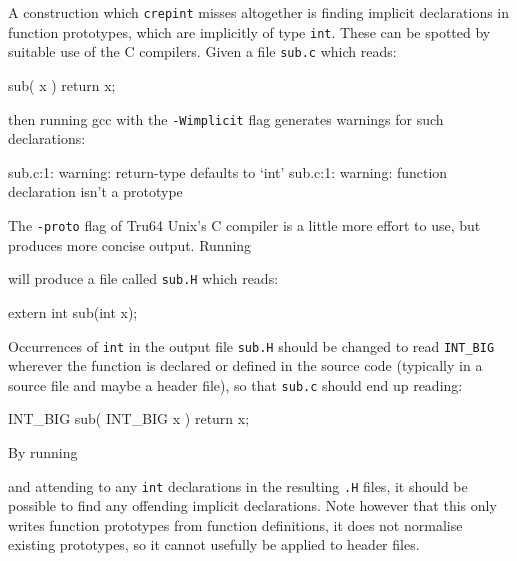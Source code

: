 \documentclass[twoside,11pt,nolof]{starlink}
\providecommand{\file}[1]{\texttt{#1}}
\providecommand{\routine}[1]{\texttt{#1}}
\providecommand{\cc}[1]{\texttt{#1}}
\newenvironment{squote}{\begin{small}}{\end{small}}
\begin{document}
A construction which \routine{crepint} misses altogether is finding
implicit declarations in function prototypes, which are implicitly
of type \cc{int}.
These can be spotted by suitable use of the C compilers.
Given a file \file{sub.c} which reads:
\begin{squote}
\begin{terminalv}
sub( x ) {
   return x;
}
\end{terminalv}
\end{squote}
then running gcc with the \texttt{-Wimplicit} flag generates warnings for
such declarations:
\begin{squote}
\begin{terminalv}
sub.c:1: warning: return-type defaults to `int'
sub.c:1: warning: function declaration isn't a prototype
\end{terminalv}
\end{squote}
The \texttt{-proto} flag of Tru64 Unix's C compiler is a little more
effort to use, but produces more concise output.  Running
\begin{squote}
\begin{terminalv}
\end{terminalv}
\end{squote}
will produce a file called \file{sub.H} which reads:
\begin{squote}
\begin{terminalv}
extern int sub(int x);
\end{terminalv}
\end{squote}
Occurrences of \cc{int} in the output file \file{sub.H} should be
changed to read \cc{INT\_BIG} wherever the function is declared or
defined in the source code (typically in a source file and maybe a
header file), so that \file{sub.c} should
end up reading:
\begin{squote}
\begin{terminalv}
INT_BIG sub( INT_BIG x ) {
   return x;
}
\end{terminalv}
\end{squote}
By running
\begin{squote}
\begin{terminalv}
\end{terminalv}
\end{squote}
and attending to any \cc{int} declarations in the resulting \file{.H} files,
it should be possible to find any offending implicit declarations.
Note however that this only writes function prototypes
from function definitions, it does not normalise existing prototypes,
so it cannot usefully be applied to header files.
\end{document}
